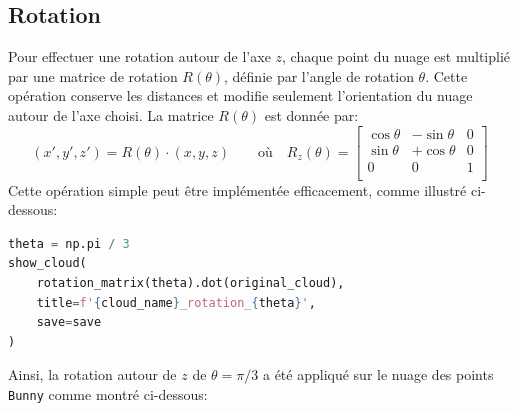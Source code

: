 \documentclass[../5RO17_TP4.tex]{subfiles}
\begin{document}
\subsection{Rotation}
\noindent Pour effectuer une rotation autour de l'axe $z$, chaque point du nuage est multiplié par une matrice de rotation $R(\theta)$, définie par l'angle de rotation $\theta$. Cette opération conserve les distances et modifie seulement l’orientation du nuage autour de l’axe choisi. La matrice $R(\theta)$ est donnée par:
\begin{equation}
    (x', y', z') = R(\theta) \cdot (x, y, z)
    \qquad
    \text{où}
    \quad
    R_z(\theta) = 
    \begin{bmatrix}
        \cos \theta & -\sin \theta & 0 \\
        \sin \theta & +\cos \theta & 0 \\
        0 & 0 & 1 \\
    \end{bmatrix}
\end{equation}
\noindent Cette opération simple peut être implémentée efficacement, comme illustré ci-dessous:\\
\begin{scriptsize}\mycode
	\begin{lstlisting}[language=Python, caption=\texttt{rotation()}]
theta = np.pi / 3
show_cloud(
    rotation_matrix(theta).dot(original_cloud),
    title=f'{cloud_name}_rotation_{theta}',
    save=save
)
	\end{lstlisting}
\end{scriptsize}
\noindent Ainsi, la rotation autour de $z$ de $\theta = \pi / 3$ a été appliqué sur le nuage des points \texttt{Bunny} comme montré ci-dessous:
\end{document}
